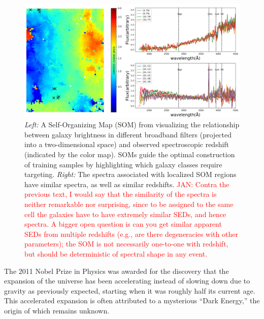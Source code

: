 \documentclass[oneside,11pt]{amsart}
\begin{document}
\begin{figure}[h!]
%
\vskip -0.1in
%
\includegraphics[width=\textwidth]{Hemmati18_Fig8_VVDS_spec.png}
%
\caption{\small \emph{Left:} A Self-Organizing Map (SOM) from
\citet{hemmati18} visualizing the relationship between galaxy
brightness in different broadband filters (projected into a two-dimensional space) and observed spectroscopic redshift (indicated by the color map).
SOMs guide the optimal construction of training samples by highlighting
which galaxy classes require targeting.  \emph{Right:} The
spectra associated with localized SOM regions have similar spectra, as well as similar redshifts. \textcolor{red}{JAN: Contra the previous text, I would say that the similarity of the spectra is neither remarkable nor surprising, since to be assigned to the same cell the galaxies have to have extremely similar SEDs, and hence spectra.  A bigger open question is can you get similar apparent SEDs from multiple redshifts (e.g., are there degeneracies with other parameters); the SOM is not necessarily one-to-one with redshift, but should be deterministic of spectral shape in any event.} }
%
\label{fig:SOM}
%
\end{figure}

The 2011 Nobel Prize in Physics was awarded for the discovery that the expansion of the universe has been accelerating instead of slowing down due to gravity as previously expected, starting when it was roughly half its current age.  This accelerated expansion is often attributed to a mysterious ``Dark Energy,'' the origin of which remains unknown.
\end{document}
